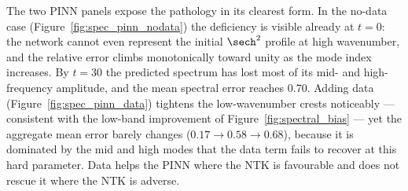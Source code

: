The two PINN panels expose the pathology in its clearest form. In the no-data case (Figure~\ref{fig:spec_pinn_nodata}) the deficiency is visible already at $t = 0$: the network cannot even represent the initial $\sech^2$ profile at high wavenumber, and the relative error climbs monotonically toward unity as the mode index increases. By $t = 30$ the predicted spectrum has lost most of its mid- and high-frequency amplitude, and the mean spectral error reaches $0.70$. Adding data (Figure~\ref{fig:spec_pinn_data}) tightens the low-wavenumber crests noticeably --- consistent with the low-band improvement of Figure~\ref{fig:spectral_bias} --- yet the aggregate mean error barely changes ($0.17 \to 0.58 \to 0.68$), because it is dominated by the mid and high modes that the data term fails to recover at this hard parameter. Data helps the PINN where the NTK is favourable and does not rescue it where the NTK is adverse.

